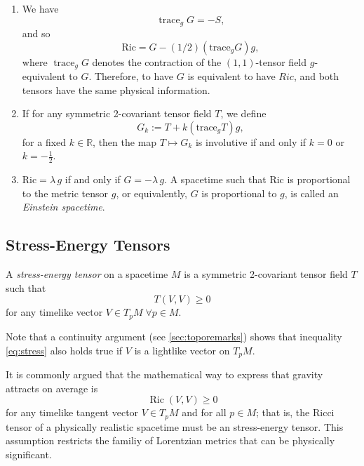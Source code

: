\begin{enumerate}
	\item We have
	\begin{equation}
	\label{eq:tracegs}
	\operatorname{trace}_gG=-S,
	\end{equation}
	and so
	\[
	\mathrm{Ric}=G-(1/2)(\mathrm{trace}_gG)g,
	\] where $\operatorname{trace}_gG$ denotes the contraction of the $(1,1)$-tensor field $g$-equivalent to $G$. Therefore, to have $G$ is equivalent to have $Ric$, and both tensors have the same physical information.
	\item If for any symmetric 2-covariant tensor field $T$, we define \[G_k:=T+k(\mathrm{trace}_gT)g,\] for a fixed $k\in \mathbb{R}$, then the map $T \longmapsto G_k$ is involutive if and only if $k=0$ or $k=-\frac{1}{2}$.
	\item $\mathrm{Ric}=\lambda\,g$ if and only if $G=-\lambda\,g$. A spacetime such that Ric is proportional to the metric tensor $g$, or equivalently, $G$ is proportional to $g$, is called an \emph{Einstein spacetime}.
\end{enumerate}

\subsection{Stress-Energy Tensors}
\label{sec:stressenergy}

\begin{definition}
	A \emph{stress-energy tensor} on a spacetime $M$ is a symmetric 2-covariant tensor field $T$ such that
	\begin{equation}
	\label{eq:stress}
	T(V,V) \geq 0
	\end{equation}
	for any timelike vector $V \in T_p M \; \forall p \in M$.
\end{definition}

Note that a continuity argument (see \autoref{sec:toporemarks}) shows that inequality \ref{eq:stress} also holds true if $V$ is a lightlike vector on $T_p M$.

It is commonly argued that the mathematical way to express that gravity attracts on average is
\begin{equation}
\operatorname{Ric} (V,V) \geq 0
\end{equation}
for any timelike tangent vector $V \in T_p M$ and for all $p \in M$; that is, the Ricci tensor of a physically realistic spacetime must be an stress-energy tensor. This assumption restricts the familiy of Lorentzian metrics that can be physically significant.

